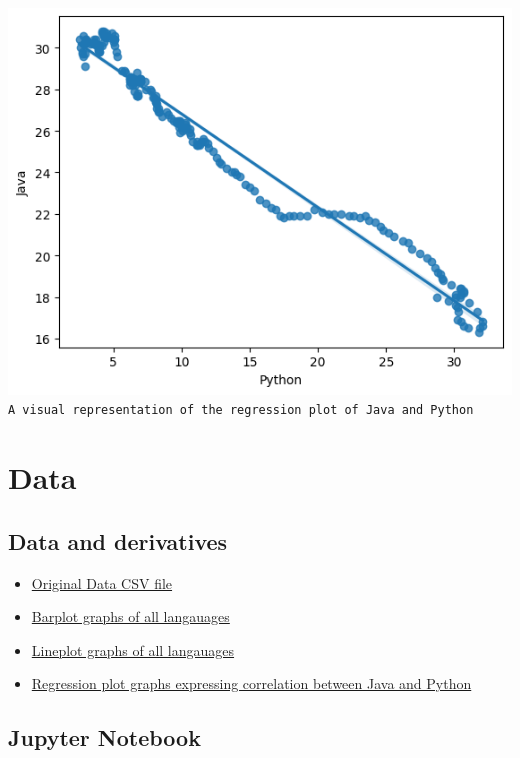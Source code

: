 \documentclass[conference]{IEEEtran}
\begin{document}
\includegraphics[scale=0.5]{regplot/java-v-python.png}\\
\texttt{A visual representation of the regression plot of Java and Python}

\section{Data}

\subsection{Data and derivatives}

\begin{itemize}
\color{blue}
\item \href{https://github.com/0thorderlogic/smalldata/blob/main/data/backup.csv}{Original Data CSV file}
\item \href{https://github.com/0thorderlogic/smalldata/tree/main/barplot}{Barplot graphs of all langauages}
\item \href{https://github.com/0thorderlogic/smalldata/tree/main/lineplot}{Lineplot graphs of all langauages}
\item \href{https://github.com/0thorderlogic/smalldata/tree/main/regplot}{Regression plot graphs expressing correlation between Java and Python}
\end{itemize}

\subsection{Jupyter Notebook}
\end{document}

